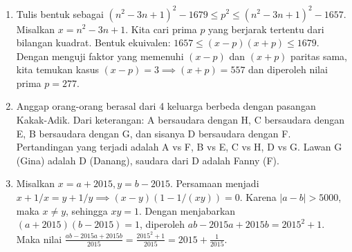 \documentclass[11pt]{article}
\begin{document}
\begin{enumerate}
\begin{align*}
BD\cdot AC&=AD\cdot BC+AB\cdot CD\\
 10 AC &= 10 BC + 10 CD \\ AC &= BC+CD\end{align*} Demikian pula $BE = DE+EA$. Total keliling tanpa $AB$ adalah $26$, maka $AC+BE=26$. Dapat dibuktikan $\triangle FCE \sim \triangle FAB$, sehingga rasio sisinya $$\frac{CE}{AB} = \frac8{10} = \frac45$$ Akibatnya $FC = \frac{4}{5}FB$ dan $FE = \frac{4}{5}FA$. \begin{align*}AC+BE&=26\\  (FA+FC)+(FB+FE)&=26 \\ \frac{9}{5}(FA+FB) &= 26 \\ FA+FB &= \frac{130}9\end{align*}
    
    \begin{center}
    \end{center}
    \item Tulis bentuk sebagai $(n^2-3n+1)^2 - 1679 \le p^2 \le (n^2-3n+1)^2 - 1657$. Misalkan $x = n^2-3n+1$. Kita cari prima $p$ yang berjarak tertentu dari bilangan kuadrat. Bentuk ekuivalen: $1657 \le (x-p)(x+p) \le 1679$. Dengan menguji faktor yang memenuhi $(x-p)$ dan $(x+p)$ paritas sama, kita temukan kasus $(x-p)=3 \implies (x+p) = 557$ dan diperoleh nilai prima $p=277$.
    \item Anggap orang-orang berasal dari 4 keluarga berbeda dengan pasangan Kakak-Adik. Dari keterangan: A bersaudara dengan H, C bersaudara dengan E, B bersaudara dengan G, dan sisanya D bersaudara dengan F. Pertandingan yang terjadi adalah A vs F, B vs E, C vs H, D vs G. Lawan G (Gina) adalah D (Danang), saudara dari D adalah Fanny (F).
    \item Misalkan $x=a+2015, y=b-2015$. Persamaan menjadi $x+1/x = y+1/y \implies (x-y)(1 - 1/(xy)) = 0$. Karena $|a-b|>5000$, maka $x \neq y$, sehingga $xy = 1$. Dengan menjabarkan $(a+2015)(b-2015)=1$, diperoleh $ab - 2015a + 2015b = 2015^2 + 1$. Maka nilai $\frac{ab-2015a+2015b}{2015} = \frac{2015^2+1}{2015} = 2015 + \frac{1}{2015}$.

\end{enumerate}
\end{document}
